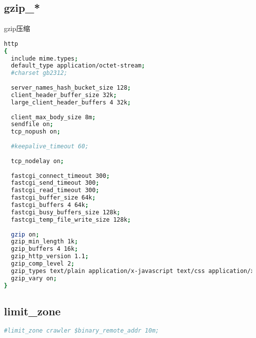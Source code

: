 \subsection{gzip\_*}


gzip压缩


\begin{lstlisting}[language=bash]
http
{
  include mime.types;
  default_type application/octet-stream;
  #charset gb2312;
  
  server_names_hash_bucket_size 128;
  client_header_buffer_size 32k;
  large_client_header_buffers 4 32k;
  
  client_max_body_size 8m;
  sendfile on;
  tcp_nopush on;
  
  #keepalive_timeout 60;
  
  tcp_nodelay on;
  
  fastcgi_connect_timeout 300;
  fastcgi_send_timeout 300;
  fastcgi_read_timeout 300;
  fastcgi_buffer_size 64k;
  fastcgi_buffers 4 64k;
  fastcgi_busy_buffers_size 128k;
  fastcgi_temp_file_write_size 128k;
  
  gzip on;
  gzip_min_length 1k;
  gzip_buffers 4 16k;
  gzip_http_version 1.1;
  gzip_comp_level 2;
  gzip_types text/plain application/x-javascript text/css application/xml;
  gzip_vary on;
}
\end{lstlisting}

\subsection{limit\_zone}



\begin{lstlisting}[language=bash]
#limit_zone crawler $binary_remote_addr 10m;
\end{lstlisting}




\begin{lstlisting}[language=bash]

\end{lstlisting}




\begin{lstlisting}[language=bash]

\end{lstlisting}





\begin{lstlisting}[language=bash]

\end{lstlisting}




